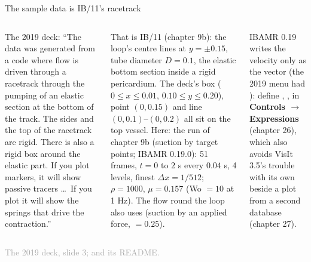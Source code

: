 \documentclass[aspectratio=169,11pt]{beamer}
\newcommand{\sourcecredit}[1]{\vfill\begin{flushright}\tiny\textcolor{DarkGray}{#1}\end{flushright}}
\newcommand{\gui}[1]{\textsf{\textbf{#1}}}
\begin{document}
\begin{frame}{The sample data is IB/11's racetrack}
\label{fr:data}
\begin{columns}[T]
\footnotesize
The 2019 deck: ``The data was generated from a code where flow is driven through a racetrack through the pumping of an elastic section at the bottom of the track. The sides and the top of the racetrack are rigid. There is also a rigid box around the elastic part. If you plot markers, it will show passive tracers \dots\ If you plot  it will show the springs that drive the contraction.''

\vspace{1mm}
That is IB/11 (chapter 9b): the loop's centre lines at $y = \pm 0.15$, tube diameter $D = 0.1$, the elastic bottom section inside a rigid pericardium. The deck's box ($0 \le x \le 0.01$, $0.10 \le y \le 0.20$), point $(0, 0.15)$ and line $(0, 0.1)$--$(0, 0.2)$ all sit on the top vessel.
\footnotesize
Here: the  run of chapter 9b (suction by target points; IBAMR 0.19.0): 51 frames, $t = 0$ to $2$ s every $0.04$ s, 4 levels, finest $\Delta x = 1/512$; $\rho = 1000$, $\mu = 0.157$ (Wo $= 10$ at 1 Hz). The flow round the loop also uses  (suction by an applied force,  $= 0.25$).

\vspace{1mm}
IBAMR 0.19 writes the velocity only as the vector  (the 2019 menu had ): define , ,  in \gui{Controls $\to$ Expressions} (chapter 26), which also avoids VisIt 3.5's trouble with its own  beside a plot from a second database (chapter 27).
\end{columns}
\sourcecredit{The 2019 deck, slide 3; \code{examples/IB/11-heart-tube-pump} and its README.}
\end{frame}
\end{document}
